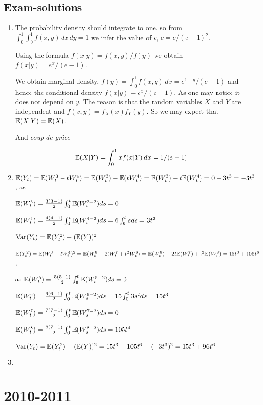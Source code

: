 \documentclass[pdftex,12pt,a4paper]{article}
\begin{document}
\subsection{Exam-solutions}
\begin{enumerate}
\item The probability density should integrate to one, so from $\int_0^1 \int_0^1 f(x,y) \, dx\, dy=1$ we infer the value of $c$, $c=e/(e-1)^2$.

Using the formula $f(x|y)=f(x,y)/f(y)$ we obtain $f(x|y)=e^x/(e-1)$.

We obtain marginal density, $f(y)=\int_0^1 f(x,y) \, dx= e^{1-y}/(e-1)$ and hence the conditional density $f(x|y)=e^x/(e-1)$. As one may notice it does not depend on $y$. The reason is that the random variables $X$ and $Y$ are independent and $f(x,y)=f_X(x)f_Y(y)$. So we may expect that $\mathbb{E}(X|Y)=\mathbb{E}(X)$.

And \href{http://en.wikipedia.org/wiki/Coup_de_gr%C3%A2ce}{\textit{coup de grâce}}

\[
\mathbb{E}(X|Y)=\int_0^1 x f(x|Y) \, dx = 1/(e-1)
\]


\item $\mathbb{E}(Y_t)=\mathbb{E}(W^3_t-tW^4_t) = \mathbb{E}(W^3_t)-\mathbb{E}(tW^4_t) = \mathbb{E}(W^3_t)-t \mathbb{E}(W^4_t)= 0 - 3t^3 = - 3t^3 $, as

$\mathbb{E}(W^{3}_{t})= \frac{3(3-1)}{2} \int_{0}^{t} \mathbb{E} (W^{3-2}_{s}) ds = 0 $

$\mathbb{E}(W^{4}_{t})= \frac{4(4-1)}{2} \int_{0}^{t} \mathbb{E} (W^{4-2}_{s}) ds = 6 \int_{0}^{t} s ds =3 t^2 $

$\operatorname{Var}(Y_t) =\mathbb{E}(Y^2_t)-(\mathbb{E}(Y))^2$

$\mathbb{E}(Y^2_t)=\mathbb{E}(W^3_t-tW^4_t)^2=\mathbb{E}(W^6_t-2tW^7_t+t^2 W^8_t)= \mathbb{E}(W^6_t)-2t\mathbb{E}(W^7_t)+t^2 \mathbb{E}(W^8_t) = 15t^3 + 105t^6$,

as $\mathbb{E}(W^{5}_{t})= \frac{5(5-1)}{2} \int_{0}^{t} \mathbb{E} (W^{5-2}_{s}) ds = 0 $

$\mathbb{E}(W^{6}_{t})= \frac{6(6-1)}{2} \int_{0}^{t} \mathbb{E} (W^{6-2}_{s}) ds = 15 \int_{0}^{t} 3s^2 ds= 15t^3 $

$\mathbb{E}(W^{7}_{t})= \frac{7(7-1)}{2} \int_{0}^{t} \mathbb{E} (W^{7-2}_{s}) ds = 0 $

$\mathbb{E}(W^{8}_{t})= \frac{8(7-1)}{2} \int_{0}^{t} \mathbb{E} (W^{8-2}_{s}) ds = 105t^4 $

$\operatorname{Var}(Y_t) =\mathbb{E}(Y^2_t)-(\mathbb{E}(Y))^2 = 15t^3 + 105t^6 - (-3t^3)^2= 15t^3 + 96 t^6$

\item 
\end{enumerate}

\section{2010-2011}
\end{document}
